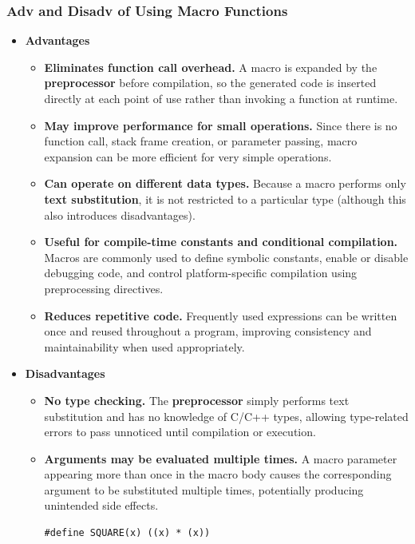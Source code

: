 \documentclass[10pt]{article}
\begin{document}
\subsubsection{Adv and Disadv of Using Macro Functions}
\begin{itemize}
    \item \textbf{Advantages}
    \begin{itemize}
        \item \textbf{Eliminates function call overhead.} A macro is expanded by the \textbf{preprocessor} before compilation, so the generated code is inserted directly at each point of use rather than invoking a function at runtime.

        \item \textbf{May improve performance for small operations.} Since there is no function call, stack frame creation, or parameter passing, macro expansion can be more efficient for very simple operations.

        \item \textbf{Can operate on different data types.} Because a macro performs only \textbf{text substitution}, it is not restricted to a particular type (although this also introduces disadvantages).

        \item \textbf{Useful for compile-time constants and conditional compilation.} Macros are commonly used to define symbolic constants, enable or disable debugging code, and control platform-specific compilation using preprocessing directives.

        \item \textbf{Reduces repetitive code.} Frequently used expressions can be written once and reused throughout a program, improving consistency and maintainability when used appropriately.
    \end{itemize}

    \item \textbf{Disadvantages}
    \begin{itemize}
        \item \textbf{No type checking.} The \textbf{preprocessor} simply performs text substitution and has no knowledge of C/C++ types, allowing type-related errors to pass unnoticed until compilation or execution.

        \item \textbf{Arguments may be evaluated multiple times.} A macro parameter appearing more than once in the macro body causes the corresponding argument to be substituted multiple times, potentially producing unintended side effects.
        \begin{verbatim}
#define SQUARE(x) ((x) * (x))


\end{verbatim}
\end{itemize}
\end{itemize}
\end{document}
